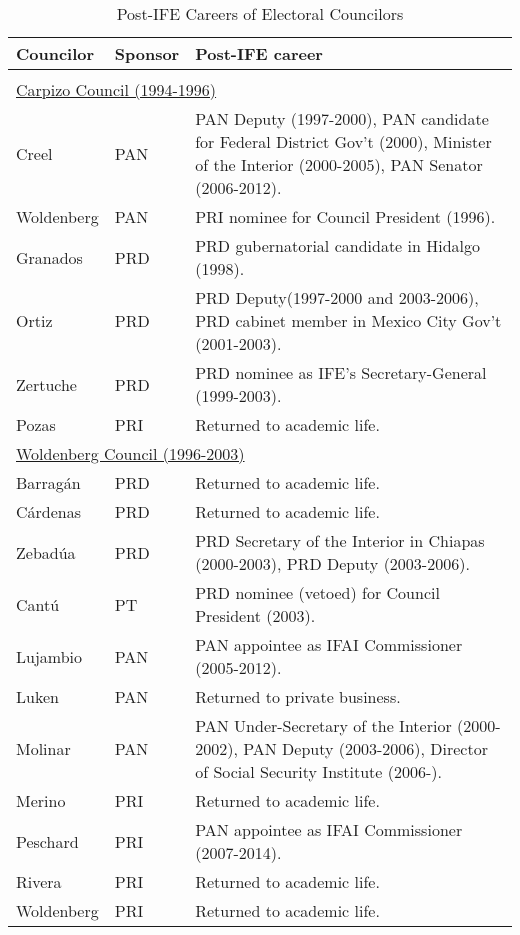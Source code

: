 \documentclass[12 pt, letter]{article}
\begin{document}
\begin{table}
\caption{Post-IFE Careers of Electoral Councilors}\label{T:postife}
\begin{center}
\begin{tabular}{llp{3in}}
\hline
Councilor & Sponsor & Post-IFE career \\ \hline \\ [-1.5ex]
\multicolumn{3}{l}{\underline{Carpizo Council (1994-1996)}}\\  [1.2ex]
Creel       & PAN & PAN Deputy (1997-2000), PAN candidate for Federal District Gov't (2000), Minister of the Interior (2000-2005), PAN Senator (2006-2012). \\ [0.5ex]
Woldenberg  & PAN & PRI nominee for Council President (1996). \\ [0.5ex]
Granados    & PRD & PRD gubernatorial candidate in Hidalgo (1998). \\ [0.5ex]
Ortiz       & PRD & PRD Deputy(1997-2000 and 2003-2006), PRD cabinet member in Mexico City Gov't (2001-2003). \\ [0.5ex]
Zertuche    & PRD & PRD nominee as IFE's Secretary-General (1999-2003). \\ [0.5ex]
Pozas       & PRI & Returned to academic life. \\ [1.2ex]
\multicolumn{3}{l}{\underline{Woldenberg Council (1996-2003)}}\\ [1.2ex]
Barrag\'an  & PRD & Returned to academic life. \\ [0.5ex]
C\'ardenas  & PRD & Returned to academic life. \\ [0.5ex]
Zebad\'ua   & PRD & PRD Secretary of the Interior in Chiapas (2000-2003), PRD Deputy (2003-2006). \\ [0.5ex]
Cant\'u     & PT  & PRD nominee (vetoed) for Council President (2003). \\ [0.5ex]
Lujambio    & PAN & PAN appointee as IFAI Commissioner (2005-2012). \\ [0.5ex]
Luken       & PAN & Returned to private business. \\ [0.5ex]
Molinar     & PAN & PAN Under-Secretary of the Interior (2000-2002), PAN Deputy (2003-2006), Director of Social Security Institute (2006-). \\ [0.5ex]
Merino      & PRI & Returned to academic life. \\ [0.5ex]
Peschard    & PRI & PAN appointee as IFAI Commissioner (2007-2014).  \\ [0.5ex]
Rivera      & PRI & Returned to academic life. \\ [0.5ex]
Woldenberg  & PRI & Returned to academic life. \\ \hline
\end{tabular}
\end{center}
\end{table}
\end{document}
